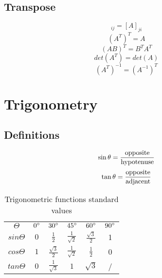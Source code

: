 \documentclass{article}
\begin{document}
		\subsection{Transpose}
			\begin{equation}
				[A^\mathrm{T}]_{ij} = [A]_{ji}
			\end{equation}
			\begin{equation}
				(A^T)^T = A
			\end{equation}
			\begin{equation}
				(AB)^T = B^TA^T %
			\end{equation}
			\begin{equation}
				det(A^T) = det(A)
			\end{equation}
			\begin{equation}
				(A^T)^{-1} = (A^{-1})^T
			\end{equation}
\section{Trigonometry}
	\subsection{Definitions}
		\begin{equation}
			\sin \theta = \frac{{{\rm{opposite}}}}{{{\rm{hypotenuse}}}}
		\end{equation}
		\begin{equation}
			\tan \theta = \frac{{{\rm{opposite}}}}{{{\rm{adjacent}}}}
		\end{equation}
	\bgroup
	\def\arraystretch{2}
		\begin{table}[h]
		\centering
		\begin{tabular}{cccccc}
			\hline
				$\Theta$	& $0\degree$ & $30\degree$ & $45\degree$ & $60\degree$ & $90\degree$ \\  
				$sin \Theta$	& $0$ & $\frac{1}{2}$ & $\frac{1}{\sqrt{2}}$ & $\frac{\sqrt{3}}{2}$ & 1	\\  
				$cos \Theta$	& $1$ & $\frac{\sqrt{3}}{2}$ & $\frac{1}{\sqrt{2}}$ & $\frac{1}{2}$	& 0 \\  
				$tan \Theta$	& $0$ & $\frac{1}{\sqrt{3}}$ & $1$ & $\sqrt{3}$	& / \\  
			\hline
		\end{tabular}
  		\caption{Trigonometric functions standard values}
  		\label{tab:standard-values}
		\end{table}
	\egroup
\end{document}
